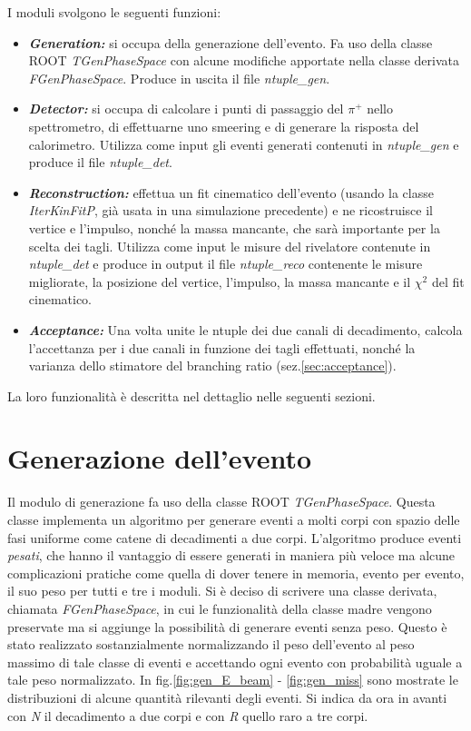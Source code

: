 \documentclass[8pt]{extarticle}
\begin{document}
I moduli svolgono le seguenti funzioni: \\
\begin{itemize}
\item \textbf{\textit{Generation:}} si occupa della generazione dell'evento. Fa uso della classe ROOT \textit{TGenPhaseSpace} con alcune modifiche apportate nella classe derivata \textit{FGenPhaseSpace}. Produce in uscita il file \textit{ntuple\_gen}.\\
\item \textbf{\textit{Detector:}} si occupa di calcolare i punti di passaggio del $\pi^+$ nello spettrometro, di effettuarne uno smeering e di generare la risposta del calorimetro. Utilizza come input gli eventi generati contenuti in \textit{ntuple\_gen} e produce il file \textit{ntuple\_det}.\\
\item \textbf{\textit{Reconstruction:}} effettua un fit cinematico dell'evento (usando la classe \textit{IterKinFitP}, già usata in una simulazione precedente\cite{spettrometro}) e ne ricostruisce il vertice e l'impulso, nonché la massa mancante, che sarà importante per la scelta dei tagli. Utilizza come input le misure del rivelatore contenute in \textit{ntuple\_det} e produce in output il file \textit{ntuple\_reco} contenente le misure migliorate, la posizione del vertice, l'impulso, la massa mancante e il $\chi^2$ del fit cinematico.\\
\item \textbf{\textit{Acceptance:}} Una volta unite le ntuple dei due canali di decadimento, calcola l'accettanza per i due canali in funzione dei tagli effettuati, nonché la varianza dello stimatore del branching ratio (sez.\ref{sec:acceptance}).
\end{itemize}

La loro funzionalità è descritta nel dettaglio nelle seguenti sezioni.

\newpage

\section{Generazione dell'evento} \label{sec:generation}
Il modulo di generazione fa uso della classe ROOT \textit{TGenPhaseSpace}. Questa classe implementa un algoritmo per generare eventi a molti corpi con spazio delle fasi uniforme come catene di decadimenti a due corpi. L'algoritmo produce eventi \textit{pesati}, che hanno il vantaggio di essere generati in maniera più veloce ma alcune complicazioni pratiche come quella di dover tenere in memoria, evento per evento, il suo peso per tutti e tre i moduli. Si è deciso di scrivere una classe derivata, chiamata \textit{FGenPhaseSpace}, in cui le funzionalità della classe madre vengono preservate ma si aggiunge la possibilità di generare eventi senza peso. Questo è stato realizzato sostanzialmente normalizzando il peso dell'evento al peso massimo di tale classe di eventi e accettando ogni evento con probabilità uguale a tale peso normalizzato. In fig.\ref{fig:gen_E_beam} - \ref{fig:gen_miss} sono mostrate le distribuzioni di alcune quantità rilevanti degli eventi. Si indica da ora in avanti con \textit{N} il decadimento a due corpi e con \textit{R} quello raro a tre corpi. 
\end{document}
